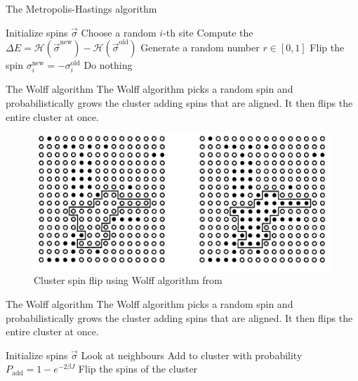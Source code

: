 \documentclass[handout]{beamer}
\begin{document}
\begin{frame}{The Metropolis-Hastings algorithm}
    \begin{algorithm}[H]
        \begin{algorithmic}[1]
            \STATE Initialize spins $\vec \sigma$
                \STATE Choose a random $i$-th site
                \STATE Compute the $\Delta E =
                    \mathcal{H}(\vec\sigma^{\text{new}}) -
                    \mathcal{H}(\vec\sigma^{\text{old}})$
                \STATE Generate a random number $r\in [0,1]$
                \STATE Flip the spin $\sigma_i^{\text{new}} =
                -\sigma_i^{\text{old}}$
                \ELSE
                    \STATE Do nothing
                \ENDIF
            \ENDWHILE
        \end{algorithmic}
        \caption{Metropolis-Hastings algorithm}
        \label{algo:metropolis}
    \end{algorithm}
\end{frame}

\begin{frame}{The Wolff algorithm}
    The \alert{Wolff algorithm} picks a random spin and probabilistically grows
    the cluster adding spins that are aligned. It then flips the entire cluster
    at once. \cite[91]{newman_barkema}

    \begin{figure}
        \centering
        \includegraphics[width=.4\textwidth]{wolff.png}
        \caption{Cluster spin flip using Wolff algorithm from
        \cite[91]{newman_barkema}}
    \end{figure}
\end{frame}

\begin{frame}{The Wolff algorithm}
    The \alert{Wolff algorithm} picks a random spin and probabilistically grows
    the cluster adding spins that are aligned. It then flips the entire cluster
    at once. \cite[91]{newman_barkema}

    \begin{algorithm}[H]
        \begin{algorithmic}[1]
            \STATE Initialize spins $\vec \sigma$
                    \STATE Look at neighbours
                    \STATE Add to cluster with probability $P_{\text{add}} = 1-e^{-2\beta J}$
                    \ENDIF
                \ENDWHILE
                \STATE Flip the spins of the cluster
            \ENDWHILE
        \end{algorithmic}
        \caption{Wolff algorithm}
        \label{algo:wolff}
    \end{algorithm}
\end{frame}
\end{document}
